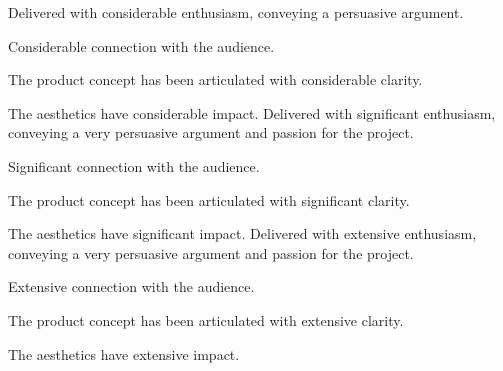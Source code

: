 \documentclass{../../fal_assignment}
\begin{document}
\begin{markingrubric}
        \grade Delivered with considerable enthusiasm, conveying a persuasive argument. 
            \par Considerable connection with the audience.
            \par The product concept has been articulated with considerable clarity.
            \par The aesthetics have considerable impact.
        \grade Delivered with significant enthusiasm, conveying a very persuasive argument and passion for the project.
            \par Significant connection with the audience.
            \par The product concept has been articulated with significant clarity.
            \par The aesthetics have significant impact.
        \grade Delivered with extensive enthusiasm, conveying a very persuasive argument and passion for the project.
            \par Extensive connection with the audience.
            \par The product concept has been articulated with extensive clarity.
            \par The aesthetics have extensive impact.

\end{markingrubric}          
            
            
\end{document}

